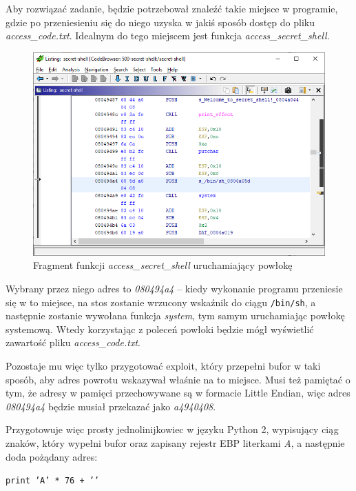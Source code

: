 \documentclass[language=polish,type=eng]{aghmodern}
\begin{document}
Aby rozwiązać zadanie, będzie potrzebował znaleźć takie miejsce w programie, gdzie
po przeniesieniu się do niego uzyska w jakiś sposób dostęp do pliku \emph{access\_code.txt}.
Idealnym do tego miejscem jest funkcja \emph{access\_secret\_shell}.

\begin{figure}[H]
\centering
\includegraphics[width=\textwidth]{500_bin_sh_address}
\caption{Fragment funkcji \emph{access\_secret\_shell} uruchamiający powłokę}
\end{figure}

Wybrany przez niego adres to \emph{080494a4} -- kiedy wykonanie programu przeniesie się w to miejsce,
na stos zostanie wrzucony wskaźnik do ciągu \texttt{/bin/sh}, a następnie zostanie wywołana
funkcja \emph{system}, tym samym uruchamiając powłokę systemową. Wtedy korzystając z poleceń
powłoki będzie mógł wyświetlić zawartość pliku \emph{access\_code.txt}.

Pozostaje mu więc tylko przygotować exploit, który przepełni bufor
w taki sposób, aby adres powrotu wskazywał właśnie na to miejsce. Musi też pamiętać
o tym, że adresy w pamięci przechowywane są w formacie Little Endian, więc adres
\emph{080494a4} będzie musiał przekazać jako \emph{a4940408}.

Przygotowuje więc prosty jednolinijkowiec w języku Python 2, wypisujący ciąg znaków,
który wypełni bufor oraz zapisany rejestr EBP literkami \emph{A},
a następnie doda pożądany adres:

\texttt{print 'A' * 76 + ''}
\end{document}
